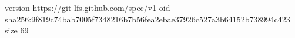 version https://git-lfs.github.com/spec/v1
oid sha256:9f819c74bab7005f7348216b7b56fea2ebae37926c527a3b64152b738994c423
size 69
